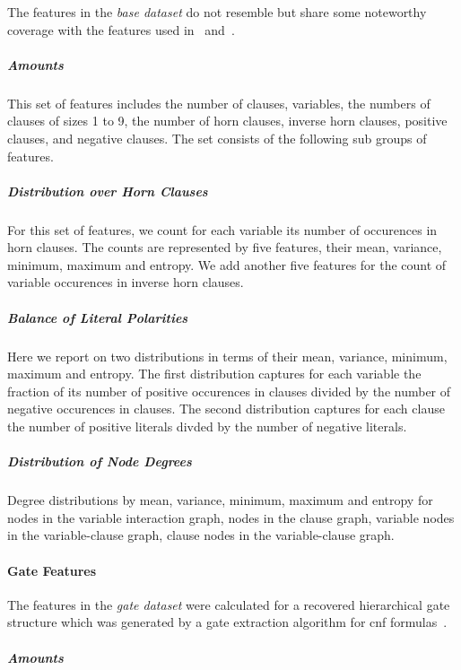 \documentclass[a4paper, USenglish, cleveref, autoref, thm-restate]{lipics-v2021}
\theoremstyle{definition}
\begin{document}
The features in the \emph{base dataset} do not resemble but share some noteworthy coverage with the features used in~\cite{Xu:2008:SATzilla} and~\cite{Alfonso:2014:Features}. 

\subparagraph{Amounts}

This set of features includes the number of \textsf{clauses}, \textsf{variables}, the numbers of clauses of \textsf{sizes 1 to 9}, the number of \textsf{horn clauses}, \textsf{inverse horn clauses}, \textsf{positive clauses}, and \textsf{negative clauses}. 
The set consists of the following sub groups of features. 

\subparagraph{Distribution over Horn Clauses}

For this set of features, we count for each variable its number of occurences in horn clauses. 
The counts are represented by five features, their \textsf{mean}, \textsf{variance}, \textsf{minimum}, \textsf{maximum} and \textsf{entropy}. 
We add another five features for the count of variable occurences in inverse horn clauses. 

\subparagraph{Balance of Literal Polarities}

Here we report on two distributions in terms of their \textsf{mean}, \textsf{variance}, \textsf{minimum}, \textsf{maximum} and \textsf{entropy}. 
The first distribution captures for each variable the fraction of its number of positive occurences in clauses divided by the number of negative occurences in clauses. 
The second distribution captures for each clause the number of positive literals divded by the number of negative literals. 

\subparagraph{Distribution of Node Degrees}

Degree distributions by \textsf{mean}, \textsf{variance}, \textsf{minimum}, \textsf{maximum} and \textsf{entropy} for nodes in the variable interaction graph, nodes in the clause graph, variable nodes in the variable-clause graph, clause nodes in the variable-clause graph. 


\paragraph{Gate Features}
\label{sec:data:gate}

The features in the \emph{gate dataset} were calculated for a recovered hierarchical gate structure which was generated by a gate extraction algorithm for cnf formulas~\cite{Iser:2015:Gates,Iser:2020:Disse}. 

\subparagraph{Amounts}
\end{document}
